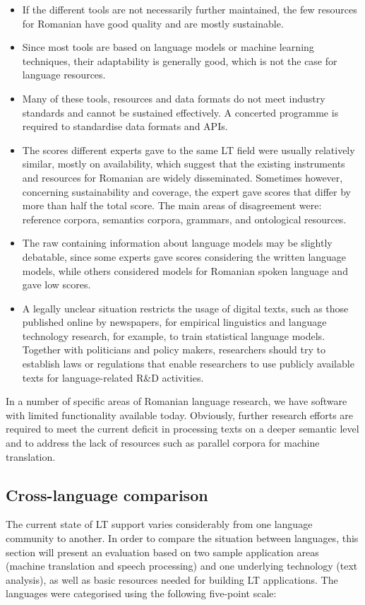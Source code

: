 \begin{multicols}{2}
\begin{itemize}
\item If the different tools are not necessarily further maintained, the few resources for Romanian have good quality and are mostly sustainable.
\item Since most tools are based on language models or machine learning techniques, their adaptability is generally good, which is not the case for language resources.
\item Many of these tools, resources and data formats do not meet industry standards and cannot be sustained effectively. A concerted programme is required to standardise data formats and APIs.
\item The scores different experts gave to the same LT field were usually relatively similar, mostly on availability, which suggest that the existing instruments and resources for Romanian are widely disseminated. Sometimes however, concerning sustainability and coverage, the expert gave scores that differ by more than half the total score. The main areas of disagreement were: reference corpora, semantics corpora, grammars, and ontological resources. 
\item The raw containing information about language models may be slightly debatable, since some experts gave scores considering the written language models, while others considered models for Romanian spoken language and gave low scores.
\item A legally unclear situation restricts the usage of digital texts, such as those published online by newspapers, for empirical linguistics and language technology research, for example, to train statistical language models. Together with politicians and policy makers, researchers should try to establish laws or regulations that enable researchers to use publicly available texts for language-related R\&D activities.
\end{itemize}

In a number of specific areas of Romanian language research, we have software with limited functionality available today. Obviously, further research efforts are required to meet the current deficit in processing texts on a deeper semantic level and to address the lack of resources such as parallel corpora for machine translation.

\subsection{Cross-language comparison}
The current state of LT support varies considerably from one language community to another. In order to compare the situation between languages, this section will present an evaluation based on two sample application areas (machine translation and speech processing) and one underlying technology (text analysis), as well as basic resources needed for building LT applications. The languages were categorised using the following five-point scale: 


\end{multicols}
